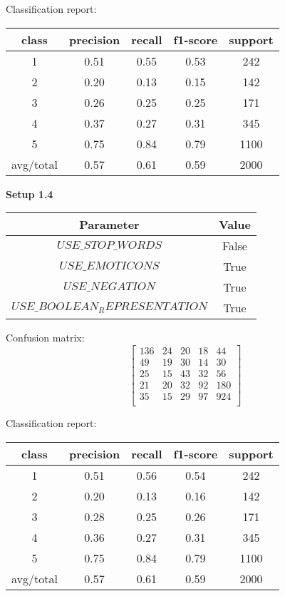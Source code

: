 \documentclass[12pt]{report}
\begin{document}
Classification report:

\begin{center}
	\begin{tabular}{c | c | c | c | c }
		\hline
		class & precision & recall & f1-score & support \\ \hline
		1 & 0.51 & 0.55 & 0.53 & 242 \\ \hline
		2 & 0.20 & 0.13 & 0.15 & 142 \\ \hline
		3 & 0.26 & 0.25 & 0.25 & 171 \\ \hline
		4 & 0.37 & 0.27 & 0.31 & 345 \\ \hline
		5 & 0.75 & 0.84 & 0.79 & 1100 \\ \hline
		avg/total & 0.57 & 0.61 & 0.59 & 2000 \\ \hline
	\end{tabular}
\end{center}


\textbf{Setup 1.4}

\begin{center}
	\begin{tabular}{ c | c }
		\hline
		Parameter & Value \\ \hline
		$USE\_STOP\_WORDS$ & False \\ \hline
		$USE\_EMOTICONS$ & True \\ \hline
		$USE\_NEGATION$ & True \\ \hline
		$USE\_BOOLEAN_REPRESENTATION$ & True \\ \hline
	\end{tabular}
\end{center}

Confusion matrix:
\[
\begin{bmatrix}
136 & 24 & 20 & 18 & 44 \\
49 & 19 & 30 & 14 & 30 \\
25 & 15 & 43 & 32 & 56 \\
21 & 20 & 32 & 92 & 180 \\
35 & 15 & 29 & 97 & 924 \\
\end{bmatrix}
\]

Classification report:

\begin{center}
	\begin{tabular}{c | c | c | c | c }
		\hline
		class & precision & recall & f1-score & support \\ \hline
		1 & 0.51 & 0.56 & 0.54 & 242 \\ \hline
		2 & 0.20 & 0.13 & 0.16 & 142 \\ \hline
		3 & 0.28 & 0.25 & 0.26 & 171 \\ \hline
		4 & 0.36 & 0.27 & 0.31 & 345 \\ \hline
		5 & 0.75 & 0.84 & 0.79 & 1100 \\ \hline
		avg/total & 0.57 & 0.61 & 0.59 & 2000 \\ \hline
	\end{tabular}
\end{center}
\end{document}
